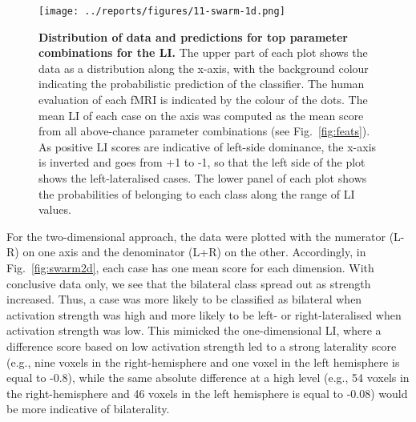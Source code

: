 \documentclass[fleqn,10pt]{SelfArx} %
\begin{document}
\begin{figure}[!htbp]
	\begin{minipage}{\textwidth}
		\renewcommand{\familydefault}{\sfdefault}\normalfont
		\centering
		\texttt{[image: ../reports/figures/11-swarm-1d.png]}
		\caption{\textbf{Distribution of data and predictions for top parameter combinations for the LI.} 
			The upper part of each plot shows the data as a distribution along the x-axis, with the background colour indicating the probabilistic prediction of the classifier. The human evaluation of each fMRI is indicated by the colour of the dots. The mean LI of each case on the axis was computed as the mean score from all above-chance parameter combinations (see Fig.~\ref{fig:feats}). As positive LI scores are indicative of left-side dominance, the x-axis is inverted and goes from +1 to -1, so that the left side of the plot shows the left-lateralised cases. The lower panel of each plot shows the probabilities of belonging to each class along the range of LI values.}%
		\label{fig:swarm1d}
	\end{minipage}
\end{figure}

For the two-dimensional approach, the data were plotted with the numerator (L-R) on one axis and the denominator (L+R) on the other. Accordingly, in Fig.~\ref{fig:swarm2d}, each case has one mean score for each dimension. With conclusive data only, we see that the bilateral class spread out as strength increased. Thus, a case was more likely to be classified as bilateral when activation strength was high and more likely to be left- or right-lateralised when activation strength was low. This mimicked the one-dimensional LI, where a difference score based on low activation strength led to a strong laterality score (e.g., nine voxels in the right-hemisphere and one voxel in the left hemisphere is equal to -0.8), while the same absolute difference at a high level (e.g., 54 voxels in the right-hemisphere and 46 voxels in the left hemisphere is equal to -0.08) would be more indicative of bilaterality.
\end{document}
